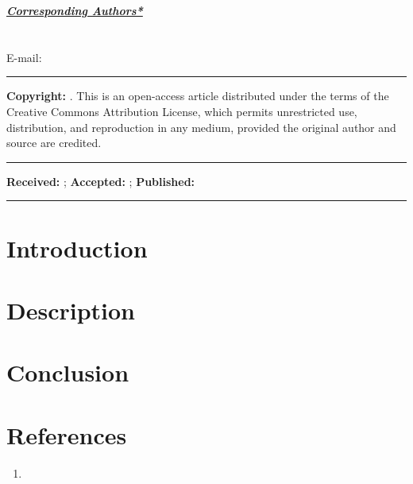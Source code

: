 \documentclass[10pt]{article} %
\begin{document}
\begin{multicols}{2}
\fontsize{9}{10.8}\selectfont\color{Black}

\begin{flushleft}
\color{DarkGreen}\textbf{\underline{\textit{Corresponding Authors*}}} \\
\vspace{0.3cm}
\color{Black}\\
\color{Black}\\
E-mail: \href{mailto:\VAR{email}}{}\\
\vspace{0.1cm}
\rule{\linewidth}{1pt}
\color{DarkGreen}\textbf{Copyright:} 
\color{Black}  . This is an open-access article distributed under the 
terms of the Creative Commons Attribution License, which permits unrestricted 
use, distribution, and reproduction in any medium, provided the original author 
and source are credited.
\vspace{0.1cm}
\rule{\linewidth}{1pt}
\color{Black}\textbf{Received:} ;
\textbf{Accepted:} ; 
\textbf{Published:} 
\rule{\linewidth}{1pt}
\end{flushleft}



\section*{Introduction}
\vspace{-0.5cm}
\begin{otherlanguage}{\VAR{lang_name}}
\end{otherlanguage}


\section*{Description}
\vspace{-0.5cm}
\begin{otherlanguage}{\VAR{lang_name}}
\end{otherlanguage}


\section*{Conclusion}
\vspace{-0.5cm}
\begin{otherlanguage}{\VAR{lang_name}}
\end{otherlanguage}


\section*{References}
\fontsize{8}{9.6}\selectfont
\begin{enumerate}
        \item \href{\VAR{item.url}}{ }
\end{enumerate}

\end{multicols}

\label{TotPages}
\end{document}

